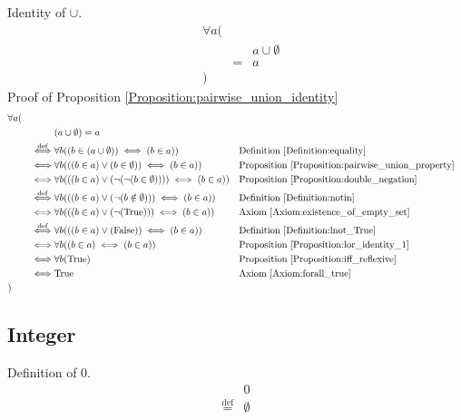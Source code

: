 \begin{prop}
\label{Proposition:pairwise_union_identity}
Identity of $\cup$.
\begin{align*}
& \forall a ( \\
& & & a \cup \emptyset \\
& & = & a \\
& )
\end{align*}
Proof of Proposition \ref{Proposition:pairwise_union_identity}
\begin{align*}
& \forall a ( \\
& & & (a \cup \emptyset) = a \\
& & \overset{\operatorname{def}}{\iff} & \forall b ((b \in (a \cup \emptyset)) \iff (b \in a))
& & \text{Definition \ref{Definition:equality}} \\
& & \iff & \forall b (((b \in a) \lor (b \in \emptyset)) \iff (b \in a))
& & \text{Proposition \ref{Proposition:pairwise_union_property}} \\
& & \iff & \forall b (((b \in a) \lor (\lnot (\lnot (b \in \emptyset)))) \iff (b \in a))
& & \text{Proposition \ref{Proposition:double_negation}} \\
& & \overset{\operatorname{def}}{\iff} & \forall b (((b \in a) \lor (\lnot (b \notin \emptyset))) \iff (b \in a))
& & \text{Definition \ref{Definition:notin}} \\
& & \iff & \forall b (((b \in a) \lor (\lnot (\text{True}))) \iff (b \in a))
& & \text{Axiom \ref{Axiom:existence_of_empty_set}} \\
& & \overset{\operatorname{def}}{\iff} & \forall b (((b \in a) \lor (\text{False})) \iff (b \in a))
& & \text{Definition \ref{Definition:lnot_True}} \\
& & \iff & \forall b ((b \in a) \iff (b \in a))
& & \text{Proposition \ref{Proposition:lor_identity_1}} \\
& & \iff & \forall b (\text{True})
& & \text{Proposition \ref{Proposition:iff_reflexive}} \\
& & \iff & \text{True}
& & \text{Axiom \ref{Axiom:forall_true}} \\
& )
\end{align*}
\end{prop}

\subsection{Integer}
\begin{defn}
\label{Definition:zero}
Definition of 0.
\begin{align*}
& 0 \\
\overset{\operatorname{def}}{=} & \emptyset
\end{align*}
\end{defn}

